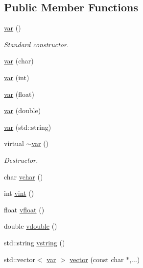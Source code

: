 \subsection*{Public Member Functions}
\begin{DoxyCompactItemize}
\item 
\hyperlink{classvar_af87bf2817f89678071ac7588a85a7f36}{var} ()
\begin{DoxyCompactList}\small\item\em Standard constructor. \end{DoxyCompactList}\item 
\hyperlink{classvar_a4afcdfc96cfac4b68e92415698f7e9de}{var} (char)
\item 
\hyperlink{classvar_a5fc966797c6c91705d714f5401b18eee}{var} (int)
\item 
\hyperlink{classvar_ab11a35ca2d25eed124494fc27f29f311}{var} (float)
\item 
\hyperlink{classvar_ad1a961ff2bb77b5e19d774a90974b17d}{var} (double)
\item 
\hyperlink{classvar_a84b88cbf0dc21a204a458b33133325d2}{var} (std\+::string)
\item 
virtual \hyperlink{classvar_ac7d2944f98e9772ab540050ae22fe9d1}{$\sim$var} ()
\begin{DoxyCompactList}\small\item\em Destructor. \end{DoxyCompactList}\item 
char \hyperlink{classvar_af5c2865eb834ce2d22991a3250d278ba}{vchar} ()
\item 
int \hyperlink{classvar_a84535a30ae85f19acb935fcc98a03abf}{vint} ()
\item 
float \hyperlink{classvar_ac811c23f3fcb941746c1dd419e68b501}{vfloat} ()
\item 
double \hyperlink{classvar_aabcdbcace1882ed0c6506deabf4eddcb}{vdouble} ()
\item 
std\+::string \hyperlink{classvar_ada169cb1305db45a1de31071ce5033e2}{vstring} ()
\item 
std\+::vector$<$ \hyperlink{classvar}{var} $>$ \hyperlink{classvar_a1fe5529702a2697eb8cf69e8f80b0d86}{vector} (const char $\ast$,...)
\end{DoxyCompactItemize}
